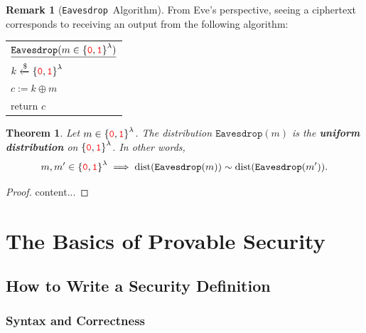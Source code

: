 \documentclass[12pt,openany]{book}
\newtheorem{theorem}{Theorem}[chapter]
\theoremstyle{definition}
\newtheorem{remark}{Remark}[chapter]
\newcommand{\set}[1]{\left\{#1\right\}}
\newcommand{\zero}{\textcolor{red}{\texttt{0}}}
\newcommand{\one}{\textcolor{red}{\texttt{1}}}
\newcommand{\tab}{\hspace{8pt}}
\newcommand{\xor}{\oplus}
\newcommand{\randomness}{\$}
\newcommand{\uniform}{\xleftarrow{\randomness}}
\newcommand{\binaryfield}{\set{\zero,\one}}
\newcommand{\eavesdrop}{\texttt{Eavesdrop}}
\begin{document}
	\newpage
	\begin{remark}[\eavesdrop\ Algorithm]
		From Eve’s perspective, seeing a ciphertext corresponds to receiving
		an output from the following algorithm: \\ \begin{center}
		\begin{tabular}{|l|}
			\hline
			\(\underline{\eavesdrop(m\in\binaryfield^\lambda)}\)\\
			\tab\(k\uniform\binaryfield^\lambda\)\\
			\tab\(c:=k\xor m\)\\
			\tab return \(c\)\\
			\hline
		\end{tabular}
		\end{center}
	\end{remark}

	\begin{tcolorbox}[colback=white,colframe=thmcolor,arc=5pt,title={\color{white}\bf }]
		\begin{theorem}
			Let \(m\in\binaryfield^\lambda\). The distribution \(\eavesdrop(m)\) is the \textbf{uniform distribution} on \(\binaryfield^\lambda\). In other words, \[
			m,m'\in\binaryfield^\lambda\implies\textnormal{dist}(\eavesdrop(m))\sim\textnormal{dist}(\eavesdrop(m')).
			\]
		\end{theorem}
	\end{tcolorbox}
	\begin{proof}
		content...
	\end{proof}
	
	\chapter{The Basics of Provable Security}
	
	\section{How to Write a Security Definition}
	\subsection{Syntax and Correctness}
	
\end{document}
